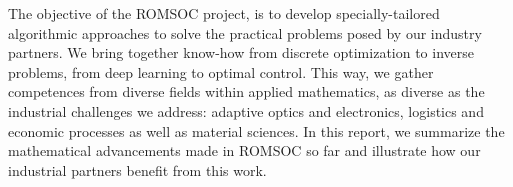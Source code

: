 The objective of the ROMSOC project,
is to develop specially-tailored algorithmic approaches
to solve the practical problems posed by our industry partners.
We bring together know-how from discrete optimization to inverse problems,
from deep learning to optimal control.
This way, we gather competences from diverse fields within applied mathematics,
as diverse as the industrial challenges we address:
adaptive optics and electronics, logistics and economic processes
as well as material sciences.
In this report, we summarize the mathematical advancements made in ROMSOC so far
and illustrate how our industrial partners benefit from this work.
